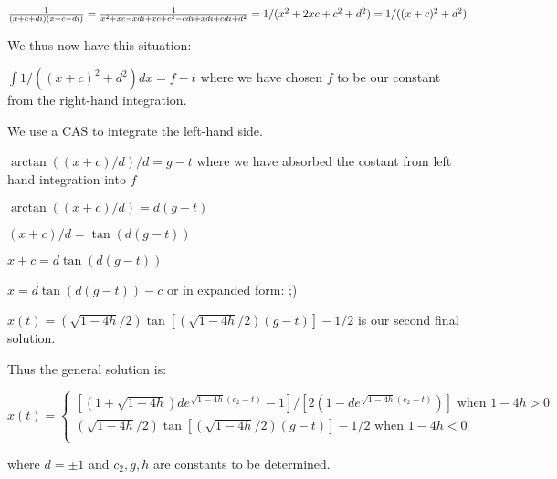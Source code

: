 \documentclass[11pt,letterpaper]{article}
\begin{document}
${1\over (x+c+di)(x+c-di)}={1\over x^2+xc-xdi+xc+c^2-cdi+xdi+cdi+d^2}=1/(x^2+2xc+c^2+d^2)=1/((x+c)^2+d^2)$

We thus now have this situation:

$\int 1/((x+c)^2+d^2)dx = f-t$ where we have chosen $f$ to be our constant from the right-hand integration.

We use a CAS to integrate the left-hand side.

$\arctan({(x+c)/d})/d=g-t$ where we have absorbed the costant from left hand integration into $f$

$\arctan((x+c)/d)=d(g-t)$

$(x+c)/d=\tan(d(g-t))$

$x+c=d\tan(d(g-t))$

$x=d\tan(d(g-t))-c$ or in expanded form: ;)

$x(t)=(\sqrt{1-4h}/2)\tan[(\sqrt{1-4h}/2)(g-t)]-1/2$ is our second final solution.

Thus the general solution is:

$x(t)=\begin{cases}
[(1+\sqrt{1-4h})de^{\sqrt{1-4h}(c_2-t)}-1]/[ 2(1-de^{\sqrt{1-4h}(c_2-t)})] \textrm{ when } 1-4h>0 \\
(\sqrt{1-4h}/2)\tan[(\sqrt{1-4h}/2)(g-t)]-1/2 \textrm{ when } 1-4h<0 \\
\end{cases}$

where $d=\pm 1$ and ${c_2,g,h}$ are constants to be determined.
\end{document}

